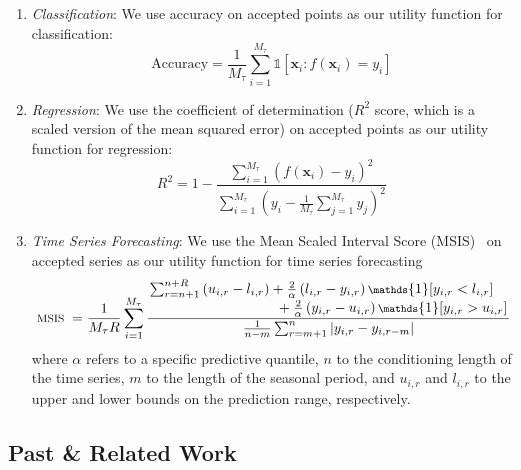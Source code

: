 \begin{enumerate}
    \item \textit{Classification}: We use accuracy on accepted points as our utility function for classification:
    \begin{equation}
        \text{Accuracy} = \frac{1}{M_\tau}\sum_{i=1}^{M_\tau} \mathds{1}[\bm{x}_i : f(\bm{x}_i) = y_i]
    \end{equation}
    \item \textit{Regression}: We use the coefficient of determination ($R^2$ score, which is a scaled version of the mean squared error) on accepted points as our utility function for regression:
    \begin{equation}
        R^2= 1 - \frac{\sum_{i=1}^{M_\tau} (f(\bm{x}_i) - y_i)^2}{\sum_{i=1}^{M_\tau} (y_i - \frac{1}{M_\tau}\sum_{j=1}^{M_\tau} y_j)^2}
    \end{equation}
    \item \textit{Time Series Forecasting}: We use the Mean Scaled Interval Score (MSIS)~\cite{gneiting2007strictly} on accepted series as our utility function for time series forecasting
    \begin{equation}
    \fontsize{7.75pt}{7.75pt}
    \text { MSIS }= \frac{1}{M_\tau R}\sum_{i=1}^{M_\tau} \frac{ \splitfrac{ \sum_{r=n+1}^{n+R}\left(u_{i,r}-l_{i,r}\right) +\frac{2}{\alpha}\left(l_{i,r}-y_{i,r}\right) \mathds{1}[y_{i,r}<l_{i,r}]}{ +\frac{2}{\alpha}\left(y_{i,r}-u_{i,r}\right)  \mathds{1}[y_{i,r}>u_{i,r}] } }{\frac{1}{n-m} \sum_{r=m+1}^n\left|y_{i,r}-y_{i,r-m}\right|}
    \end{equation}
    where $\alpha$ refers to a specific predictive quantile, $n$ to the conditioning length of the time series, $m$ to the length of the seasonal period, and $u_{i,r}$ and $l_{i,r}$ to the upper and lower bounds on the prediction range, respectively.
\end{enumerate}

\subsection{Past \& Related Work} 

